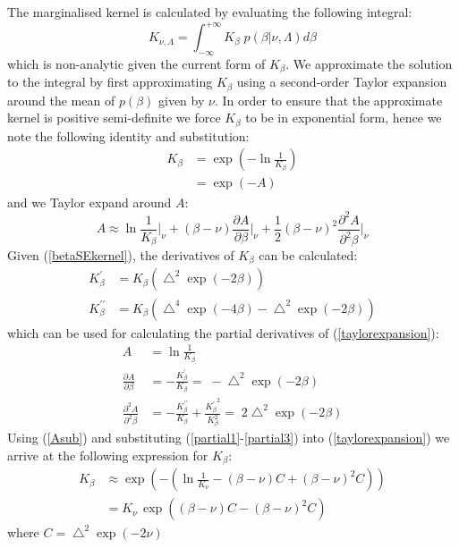 \documentclass{article}
\begin{document}
The marginalised kernel is calculated by evaluating the following integral:
\begin{equation} \label{kernelmargint} 
K_{\nu,\Lambda} = \int_{-\infty}^{+\infty} K_\beta \; p(\beta|\nu,\Lambda) d\beta
\end{equation} 
which is non-analytic given the current form of $K_\beta$. We approximate the solution to the integral by first approximating $K_\beta$ using a second-order Taylor expansion around the mean of $p(\beta)$ given by $\nu$. In order to ensure that the approximate kernel is positive semi-definite we force $K_\beta$ to be in exponential form, hence we note the following identity and substitution:
\begin{align}
K_\beta &= \exp \left( -\ln \frac{1}{K_\beta} \right) \nonumber\\ 
&= \exp \left( -A \right) \label{Asub}
\end{align}
and we Taylor expand around $A$:
\begin{equation} \label{taylorexpansion}
A \approx \ln \frac{1}{K_{\beta}}\bigg|_{\nu} + (\beta-\nu) \frac{\partial{A}}{\partial{\beta}}\bigg|_{\nu} + \frac{1}{2}(\beta-\nu)^2 \frac{\partial^2{A}}{\partial^2{\beta}}\bigg|_{\nu}
\end{equation}
Given (\ref{betaSEkernel}), the derivatives of $K_\beta$ can be calculated:
\begin{align*}
K^\prime_\beta &= K_\beta \left( \bigtriangleup^2 \exp(-2\beta)  \right) \\ 
K^{\prime\prime}_\beta &= K_\beta \left( \bigtriangleup^4 \exp(-4\beta) -  \bigtriangleup^2 \exp(-2\beta) \right)
\end{align*}
which can be used for calculating the partial derivatives of (\ref{taylorexpansion}):
\begin{align}
A &= \ln \frac{1}{K_\beta} \label{partial1}\\
\frac{\partial{A}}{\partial{\beta}} &= -\frac{K^\prime_\beta}{K_\beta} = \; -\bigtriangleup^2 \exp(-2\beta) \label{partial2}\\
\frac{\partial^2{A}}{\partial^2{\beta}} &= -\frac{K^{\prime\prime}_\beta}{K_\beta} + \frac{{K^\prime_\beta}^2}{K_\beta^2} = \; 2 \bigtriangleup^2 \exp(-2\beta) \label{partial3}
\end{align}
Using (\ref{Asub}) and substituting (\ref{partial1}-\ref{partial3}) into (\ref{taylorexpansion}) we arrive at the following expression for $K_\beta$:
\begin{align}
K_\beta &\approx \exp \left(-\left( \ln \frac{1}{K_{\nu}} - (\beta-\nu) C + (\beta-\nu)^2 C \right)   \right) \nonumber\\
&= K_{\nu} \, \exp \left( (\beta-\nu) C - (\beta-\nu)^2 C \right) \label{approxkernel}
\end{align}
where $C = \bigtriangleup^2 \exp(-2\nu)$
\end{document}
